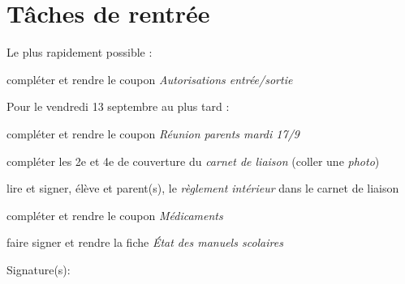 \documentclass[10pt,a5paper]{article}
\begin{document}
\PfCPanneaux[FeuTricolore]
\section*{Tâches de rentrée}

Le plus rapidement possible :

\begin{todolist}
    \item compléter et rendre le coupon \emph{Autorisations entrée/sortie}
\end{todolist}

Pour le vendredi 13 septembre au plus tard :
\begin{todolist}
\item  compléter et rendre le coupon \emph{Réunion parents mardi 17/9}
\item  compléter les 2e et 4e de couverture du \emph{carnet de liaison} (coller une \emph{photo})
\item  lire et signer, élève et parent(s), le \emph{règlement intérieur} dans le carnet de liaison
\item  compléter et rendre le coupon \emph{Médicaments}
\item  faire signer et rendre la fiche \emph{État des manuels scolaires}
\end{todolist}
Signature(s):
\end{document}
